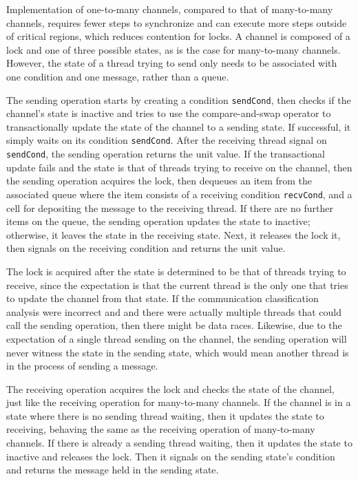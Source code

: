 \documentclass[10pt]{article}
\begin{document}
Implementation of one-to-many channels, compared to that of many-to-many channels,
requires fewer
steps to synchronize and can execute more steps outside of critical regions, which reduces
contention for locks. A channel is composed of a lock and one of three possible states, as is
the case for many-to-many channels.  However, the state of a thread trying to send only needs
to be associated with one condition and one message, rather than a queue.  

The sending operation starts by creating a condition \lstinline{sendCond}, then checks
if the channel's state is inactive and tries to use the
compare-and-swap operator to transactionally update the state of
the channel to a sending state.
If successful, it simply waits on its condition \lstinline{sendCond}.
After the receiving thread signal on \lstinline{sendCond}, the sending operation returns the unit value.
If the transactional update fails and the state is
that of threads trying to receive on the channel, then the sending operation acquires the lock,
then dequeues an item from the associated queue where the item consists of a receiving condition \lstinline{recvCond},
and a cell for depositing the message to the receiving thread.
If there are no further items on the queue, the sending operation updates the state to inactive; otherwise, it
leaves the state in the receiving state.
Next, it releases the lock it, then signals on the receiving condition and returns the unit value.

The lock is acquired after the state is determined to be that of
threads trying to receive, since the expectation is that the current thread is the only one
that tries to update the channel from that state.  If the communication classification analysis were
incorrect and and there were actually multiple threads that could call the sending operation,
then there might be data races.  Likewise, due to the expectation of a single thread
sending on the channel, the sending operation will never witness the state in the sending state,
which would mean another thread is in the process of sending a message.

The receiving operation acquires the lock and checks
the state of the channel, just like the receiving operation for many-to-many channels.
If the channel is in a state where there is no sending thread waiting,
then it updates the state to receiving, behaving the same as the receiving operation of many-to-many channels.
If there is already a sending thread waiting, then it updates the state to inactive and
releases the lock. Then it signals on the sending state's condition and
returns the message held in the sending state.
\end{document}
